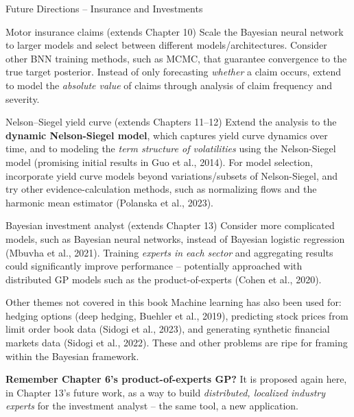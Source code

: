 \documentclass[aspectratio=169,10pt]{beamer}
\begin{document}
\begin{frame}[allowframebreaks]{Future Directions -- Insurance and Investments}
  \begin{block}{Motor insurance claims (extends Chapter 10)}
    Scale the Bayesian neural network to larger models and select
    between different models/architectures. Consider other BNN training
    methods, such as MCMC, that guarantee convergence to the true target
    posterior. Instead of only forecasting \emph{whether} a claim occurs,
    extend to model the \emph{absolute value} of claims through analysis
    of claim frequency and severity.
  \end{block}
  \begin{block}{Nelson--Siegel yield curve (extends Chapters 11--12)}
    Extend the analysis to the \textbf{dynamic Nelson-Siegel model},
    which captures yield curve dynamics over time, and to modeling the
    \emph{term structure of volatilities} using the Nelson-Siegel model
    (promising initial results in Guo et al., 2014). For model selection,
    incorporate yield curve models beyond variations/subsets of
    Nelson-Siegel, and try other evidence-calculation methods, such as
    normalizing flows and the harmonic mean estimator (Polanska et al.,
    2023).
  \end{block}

  \framebreak

  \begin{block}{Bayesian investment analyst (extends Chapter 13)}
    Consider more complicated models, such as Bayesian neural networks,
    instead of Bayesian logistic regression (Mbuvha et al., 2021).
    Training \emph{experts in each sector} and aggregating results could
    significantly improve performance -- potentially approached with
    distributed GP models such as the product-of-experts (Cohen et al.,
    2020).
  \end{block}
  \begin{block}{Other themes not covered in this book}
    Machine learning has also been used for: hedging options (deep
    hedging, Buehler et al., 2019), predicting stock prices from limit
    order book data (Sidogi et al., 2023), and generating synthetic
    financial markets data (Sidogi et al., 2022). These and other
    problems are ripe for framing within the Bayesian framework.
  \end{block}

  \textbf{Remember Chapter 6's product-of-experts GP?} It is proposed
  again here, in Chapter 13's future work, as a way to build
  \emph{distributed, localized industry experts} for the investment
  analyst -- the same tool, a new application.
\end{frame}
\end{document}
